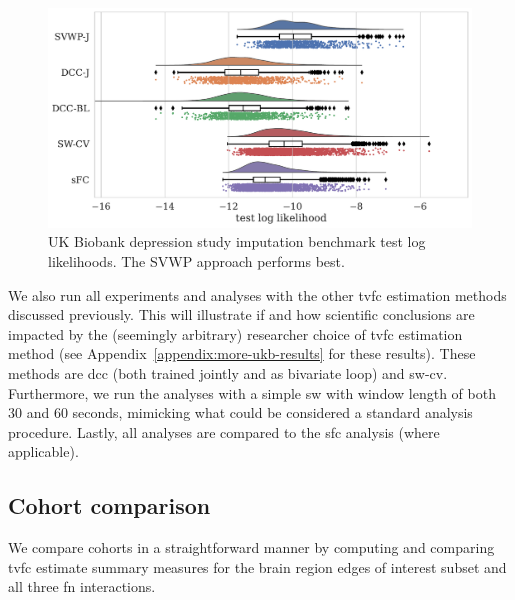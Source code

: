 \begin{figure}[ht]
  \centering
  \includegraphics[width=\textwidth]{fig/ukbiobank/imputation_study/ROI/LEOO_test_log_likelihoods_raincloud}
  \caption{
    UK Biobank depression study imputation benchmark test log likelihoods.
    The SVWP approach performs best.
  }\label{fig:ukb-imputation-benchmark}
\end{figure}


We also run all experiments and analyses with the other \gls{tvfc} estimation methods discussed previously.
This will illustrate if and how scientific conclusions are impacted by the (seemingly arbitrary) researcher choice of \gls{tvfc} estimation method (see Appendix~\ref{appendix:more-ukb-results} for these results).
These methods are \gls{dcc} (both trained jointly and as bivariate loop) and \gls{sw-cv}.
Furthermore, we run the analyses with a simple \gls{sw} with window length of both 30 and 60 seconds, mimicking what could be considered a standard analysis procedure.
Lastly, all analyses are compared to the \gls{sfc} analysis (where applicable).

\subsection{Cohort comparison}

We compare cohorts in a straightforward manner by computing and comparing \gls{tvfc} estimate summary measures for the brain region edges of interest subset and all three \gls{fn} interactions.

